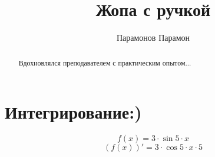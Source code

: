 \documentclass{article}
\title{Жопа с ручкой}
\author{Парамонов Парамон}
\begin{document}
\maketitle
\begin{abstract}
Вдохновлялся преподавателем с практическим опытом...
\end{abstract}
\section{Интегрирование:)}
\[f(x) = {3} \cdot \sin{{5} \cdot {x}}\]
\[(f(x))' = {3} \cdot \cos{{5} \cdot {x}} \cdot {5}\]
\end{document}
